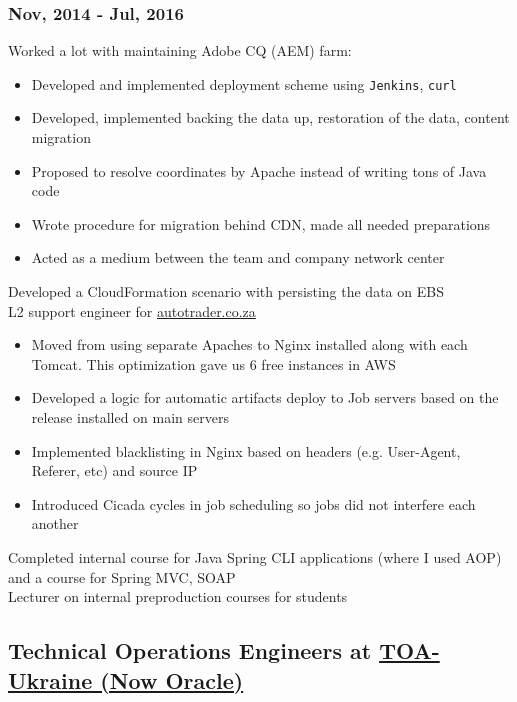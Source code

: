 \documentclass[letterpaper]{article}
\begin{document}
\subsubsection{Nov, 2014 - Jul, 2016}
\label{sec-2-2-1}
Worked a lot with maintaining Adobe CQ (AEM) farm:
\begin{itemize}
\item Developed and implemented deployment scheme using \verb~Jenkins~, \verb~curl~
\item Developed, implemented backing the data up, restoration of the data, content migration
\item Proposed to resolve coordinates by Apache instead of writing tons of Java code
\item Wrote procedure for migration behind CDN, made all needed preparations
\item Acted as a medium between the team and company network center
\end{itemize}
Developed a CloudFormation scenario with persisting the data on EBS\\
L2 support engineer for \href{http://autotrader.co.za}{autotrader.co.za}
\begin{itemize}
\item Moved from using separate Apaches to Nginx installed along with each Tomcat. This optimization gave us 6 free instances in AWS
\item Developed a logic for automatic artifacts deploy to Job servers based on the release installed on main servers
\item Implemented blacklisting in Nginx based on headers (e.g. User-Agent, Referer, etc) and source IP
\item Introduced Cicada cycles in job scheduling so jobs did not interfere each another
\end{itemize}
Completed internal course for Java Spring CLI applications (where I used AOP) and a course for Spring MVC, SOAP\\
Lecturer on internal preproduction courses for students
\subsection{Technical Operations Engineers at \href{http://toa-ukraine.com}{TOA-Ukraine (Now Oracle)}}
\label{sec-2-3}
\end{document}
